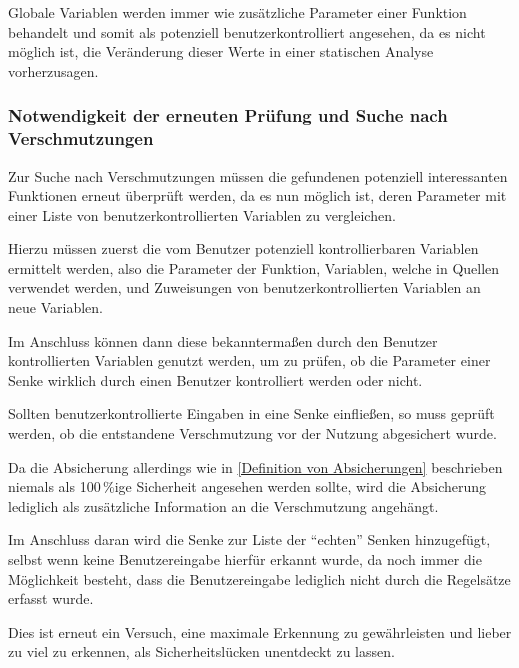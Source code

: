             Globale Variablen werden immer wie zusätzliche Parameter einer Funktion behandelt und
            somit als potenziell benutzerkontrolliert angesehen,
            da es nicht möglich ist,
            die Veränderung dieser Werte in einer statischen Analyse vorherzusagen.

            \subsubsection{Notwendigkeit der erneuten Prüfung und Suche nach Verschmutzungen}
                Zur Suche nach Verschmutzungen müssen die gefundenen potenziell interessanten Funktionen erneut überprüft werden,
                da es nun möglich ist,
                deren Parameter mit einer Liste von benutzerkontrollierten Variablen zu vergleichen.

                Hierzu müssen zuerst die vom Benutzer potenziell kontrollierbaren Variablen ermittelt werden,
                also die Parameter der Funktion,
                Variablen,
                welche in Quellen verwendet werden,
                und
                Zuweisungen von benutzerkontrollierten Variablen an neue Variablen.

                Im Anschluss können dann diese bekanntermaßen durch den Benutzer kontrollierten Variablen genutzt werden,
                um zu prüfen,
                ob die Parameter einer Senke wirklich durch einen Benutzer kontrolliert werden oder
                nicht.

                Sollten benutzerkontrollierte Eingaben in eine Senke einfließen,
                so muss geprüft werden,
                ob die entstandene Verschmutzung vor der Nutzung abgesichert wurde.

                Da die Absicherung allerdings wie in
                \vref{Definition von Absicherungen} beschrieben niemals als 100\,\%ige Sicherheit angesehen werden sollte,
                wird die Absicherung lediglich als zusätzliche Information an die Verschmutzung angehängt.

                Im Anschluss daran wird die Senke zur Liste der
                \enquote{echten} Senken hinzugefügt,
                selbst wenn keine Benutzereingabe hierfür erkannt wurde,
                da noch immer die Möglichkeit besteht,
                dass die Benutzereingabe lediglich nicht durch die Regelsätze erfasst wurde.

                Dies ist erneut ein Versuch,
                eine maximale Erkennung zu gewährleisten und
                lieber zu viel zu erkennen,
                als Sicherheitslücken unentdeckt zu lassen.

